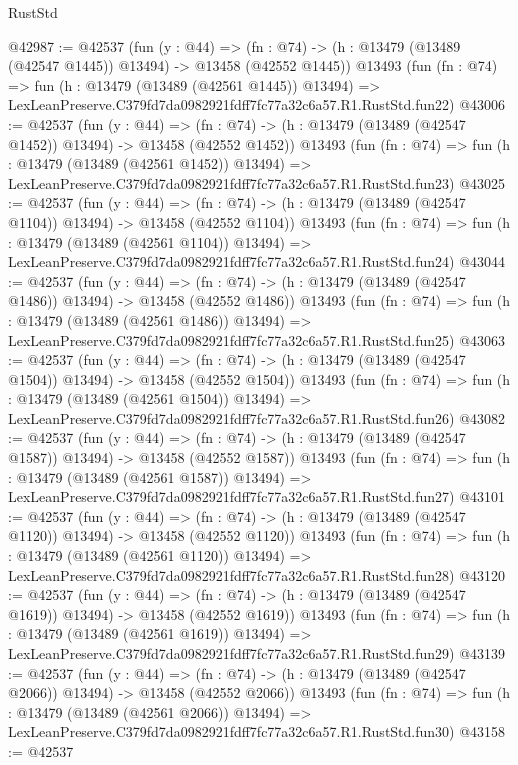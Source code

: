 \begin{lexlean}{RustStd}
\begin{coremodule}
@42987 := @42537
    (fun (y : @44) =>
    (fn : @74) -> (h : @13479 (@13489 (@42547 @1445)) @13494) -> @13458 (@42552 @1445))
    @13493
    (fun (fn : @74) =>
    fun (h : @13479 (@13489 (@42561 @1445)) @13494) =>
    LexLeanPreserve.C379fd7da0982921fdff7fc77a32c6a57.R1.RustStd.fun22)
@43006 := @42537
    (fun (y : @44) =>
    (fn : @74) -> (h : @13479 (@13489 (@42547 @1452)) @13494) -> @13458 (@42552 @1452))
    @13493
    (fun (fn : @74) =>
    fun (h : @13479 (@13489 (@42561 @1452)) @13494) =>
    LexLeanPreserve.C379fd7da0982921fdff7fc77a32c6a57.R1.RustStd.fun23)
@43025 := @42537
    (fun (y : @44) =>
    (fn : @74) -> (h : @13479 (@13489 (@42547 @1104)) @13494) -> @13458 (@42552 @1104))
    @13493
    (fun (fn : @74) =>
    fun (h : @13479 (@13489 (@42561 @1104)) @13494) =>
    LexLeanPreserve.C379fd7da0982921fdff7fc77a32c6a57.R1.RustStd.fun24)
@43044 := @42537
    (fun (y : @44) =>
    (fn : @74) -> (h : @13479 (@13489 (@42547 @1486)) @13494) -> @13458 (@42552 @1486))
    @13493
    (fun (fn : @74) =>
    fun (h : @13479 (@13489 (@42561 @1486)) @13494) =>
    LexLeanPreserve.C379fd7da0982921fdff7fc77a32c6a57.R1.RustStd.fun25)
@43063 := @42537
    (fun (y : @44) =>
    (fn : @74) -> (h : @13479 (@13489 (@42547 @1504)) @13494) -> @13458 (@42552 @1504))
    @13493
    (fun (fn : @74) =>
    fun (h : @13479 (@13489 (@42561 @1504)) @13494) =>
    LexLeanPreserve.C379fd7da0982921fdff7fc77a32c6a57.R1.RustStd.fun26)
@43082 := @42537
    (fun (y : @44) =>
    (fn : @74) -> (h : @13479 (@13489 (@42547 @1587)) @13494) -> @13458 (@42552 @1587))
    @13493
    (fun (fn : @74) =>
    fun (h : @13479 (@13489 (@42561 @1587)) @13494) =>
    LexLeanPreserve.C379fd7da0982921fdff7fc77a32c6a57.R1.RustStd.fun27)
@43101 := @42537
    (fun (y : @44) =>
    (fn : @74) -> (h : @13479 (@13489 (@42547 @1120)) @13494) -> @13458 (@42552 @1120))
    @13493
    (fun (fn : @74) =>
    fun (h : @13479 (@13489 (@42561 @1120)) @13494) =>
    LexLeanPreserve.C379fd7da0982921fdff7fc77a32c6a57.R1.RustStd.fun28)
@43120 := @42537
    (fun (y : @44) =>
    (fn : @74) -> (h : @13479 (@13489 (@42547 @1619)) @13494) -> @13458 (@42552 @1619))
    @13493
    (fun (fn : @74) =>
    fun (h : @13479 (@13489 (@42561 @1619)) @13494) =>
    LexLeanPreserve.C379fd7da0982921fdff7fc77a32c6a57.R1.RustStd.fun29)
@43139 := @42537
    (fun (y : @44) =>
    (fn : @74) -> (h : @13479 (@13489 (@42547 @2066)) @13494) -> @13458 (@42552 @2066))
    @13493
    (fun (fn : @74) =>
    fun (h : @13479 (@13489 (@42561 @2066)) @13494) =>
    LexLeanPreserve.C379fd7da0982921fdff7fc77a32c6a57.R1.RustStd.fun30)
@43158 := @42537

\end{coremodule}
\end{lexlean}
